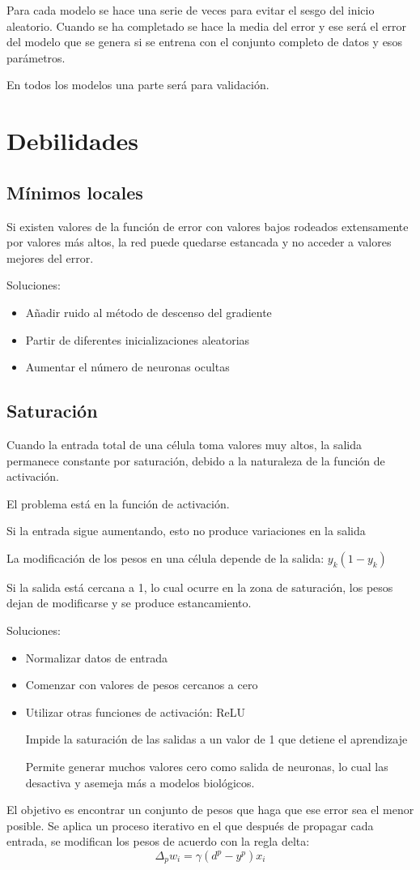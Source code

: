 \documentclass[12pt, twoside, openright]{report} %
\begin{document}
Para cada modelo se hace una serie de veces para evitar el sesgo del inicio aleatorio. Cuando se ha completado se hace la media del error y ese será el error del modelo que se genera si se entrena con el conjunto completo de datos y esos parámetros.

En todos los modelos una parte será para validación.

\section{Debilidades}
\subsection{Mínimos locales}
Si existen valores de la función de error con valores bajos rodeados extensamente por valores más altos, la red puede quedarse estancada y no acceder a valores mejores del error.

Soluciones:
\begin{itemize}
	\item Añadir ruido al método de descenso del gradiente
	\item Partir de diferentes inicializaciones aleatorias
	\item Aumentar el número de neuronas ocultas
\end{itemize}

\subsection{Saturación}
Cuando la entrada total de una célula toma valores muy altos, la salida permanece constante por saturación, debido a la naturaleza de la función de activación.

El problema está en la función de activación.

Si la entrada sigue aumentando, esto no produce variaciones en la salida

La modificación de los pesos en una célula depende de la salida: $y_k(1 - y_k)$

Si la salida está cercana a 1, lo cual ocurre en la zona de saturación, los pesos dejan de modificarse y se produce estancamiento.

Soluciones:
\begin{itemize}
	\item Normalizar datos de entrada
	\item Comenzar con valores de pesos cercanos a cero
	\item Utilizar otras funciones de activación: ReLU
	
	Impide la saturación de las salidas a un valor de 1 que detiene el aprendizaje
	
	Permite generar muchos valores cero como salida de neuronas, lo cual las desactiva y asemeja más a modelos biológicos.
\end{itemize}
El objetivo es encontrar un conjunto de pesos que haga que ese error sea el menor posible. Se aplica un proceso iterativo en el que después de propagar cada entrada, se modifican los pesos de acuerdo con la regla delta:
$$\Delta_pw_i=\gamma(d^p-y^p)x_i$$
\end{document}
